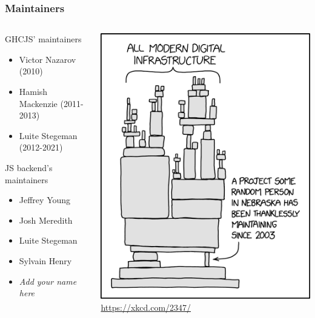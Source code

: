 \documentclass{beamer}
\begin{document}
\begin{frame}
\frametitle{Maintainers}
\begin{columns}

\begin{column}{0.6\textwidth}
GHCJS’ maintainers
\begin{itemize}
\item Victor Nazarov (2010)
\item Hamish Mackenzie (2011-2013)
\item Luite Stegeman (2012-2021)
\end{itemize}

JS backend’s maintainers
\begin{itemize}
\item Jeffrey Young
\item Josh Meredith
\item Luite Stegeman
\item Sylvain Henry
\item \textit{Add your name here}
\end{itemize}
\end{column}

\begin{column}{0.4\textwidth}
\begin{center}
\includegraphics[scale=0.3]{images/xkcd_2347.png}
\tiny\url{https://xkcd.com/2347/}
\end{center}
\end{column}

\end{columns}

\end{frame}
\end{document}
